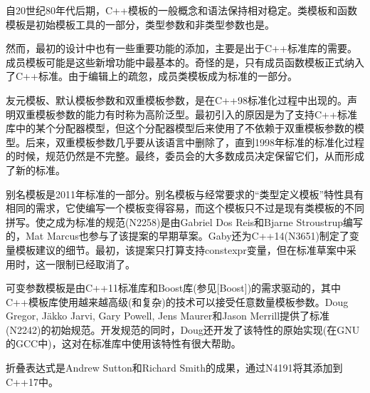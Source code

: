 自20世纪80年代后期，C++模板的一般概念和语法保持相对稳定。类模板和函数模板是初始模板工具的一部分，类型参数和非类型参数也是。

然而，最初的设计中也有一些重要功能的添加，主要是出于C++标准库的需要。成员模板可能是这些新增功能中最基本的。奇怪的是，只有成员函数模板正式纳入了C++标准。由于编辑上的疏忽，成员类模板成为标准的一部分。

友元模板、默认模板参数和双重模板参数，是在C++98标准化过程中出现的。声明双重模板参数的能力有时称为高阶泛型。最初引入的原因是为了支持C++标准库中的某个分配器模型，但这个分配器模型后来使用了不依赖于双重模板参数的模型。后来，双重模板参数几乎要从该语言中删除了，直到1998年标准的标准化过程的时候，规范仍然是不完整。最终，委员会的大多数成员决定保留它们，从而形成了新的标准。

别名模板是2011年标准的一部分。别名模板与经常要求的“类型定义模板”特性具有相同的需求，它使编写一个模板变得容易，而这个模板只不过是现有类模板的不同拼写。使之成为标准的规范(N2258)是由Gabriel Dos Reis和Bjarne Stroustrup编写的，Mat Marcus也参与了该提案的早期草案。Gaby还为C++14(N3651)制定了变量模板建议的细节。最初，该提案只打算支持constexpr变量，但在标准草案中采用时，这一限制已经取消了。

可变参数模板是由C++11标准库和Boost库(参见[Boost])的需求驱动的，其中C++模板库使用越来越高级(和复杂)的技术可以接受任意数量模板参数。Doug Gregor, J{\"a}kko Jarvi, Gary Powell, Jens Maurer和Jason Merrill提供了标准(N2242)的初始规范。开发规范的同时，Doug还开发了该特性的原始实现(在GNU的GCC中)，这对在标准库中使用该特性有很大帮助。

折叠表达式是Andrew Sutton和Richard Smith的成果，通过N4191将其添加到C++17中。










